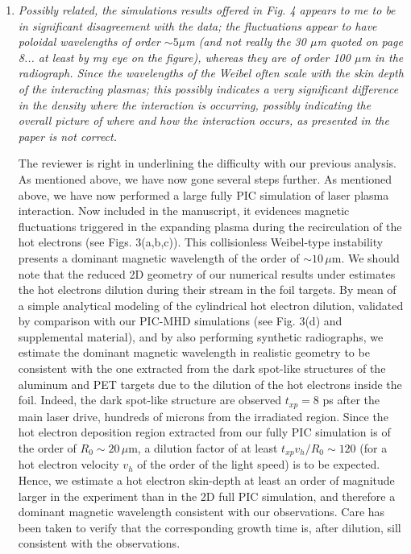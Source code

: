 \documentclass{article}
\begin{document}
\begin{enumerate}
\item \textit{Possibly related, the simulations results offered in Fig. 4 appears to me to be in significant disagreement with the data; the fluctuations appear to have poloidal wavelengths of order $\sim 5 \mu$m (and not really the 30 $\mu$m quoted on page 8... at least by my eye on the figure), whereas they are of order 100 $\mu$m in the radiograph. Since the wavelengths of the Weibel often scale with the skin depth of the interacting plasmas; this possibly indicates a very significant difference in the density where the interaction is occurring, possibly indicating the overall picture of where and how the interaction occurs, as presented in the paper is not correct. }

The reviewer is right in underlining the difficulty with our previous analysis. As mentioned above, we have now gone several steps further. 
As mentioned above, we have now performed a  large fully PIC simulation of laser plasma interaction. Now included in the manuscript, it evidences magnetic fluctuations triggered in the expanding plasma during the recirculation of the hot electrons (see Figs. 3(a,b,c)). This collisionless Weibel-type instability presents a dominant magnetic wavelength of the order of $\sim 10 \, \mu$m.
We should note that the reduced 2D geometry of our numerical results under estimates the hot electrons dilution during their stream in the foil targets. 
By mean of a simple analytical modeling of the cylindrical hot electron dilution, validated by comparison with our PIC-MHD simulations (see Fig. 3(d) and supplemental material), and by also performing synthetic radiographs, we  estimate the  dominant magnetic wavelength in realistic geometry to be consistent with the one extracted from the dark spot-like structures of the aluminum  and PET targets due to the dilution of the hot electrons inside the foil.
Indeed, the dark spot-like structure are observed $t_{xp}   = 8$ ps   after the main laser drive, hundreds of  microns from the irradiated region.
Since the hot electron deposition region extracted from our fully PIC simulation is of the order of $R_0\sim 20\, \mu$m, 
a dilution factor of at least $t_{xp} v_h / R_0 \sim 120$ (for a hot electron velocity $v_h$ of the order of  the light speed) is to be expected. Hence, we estimate a hot electron skin-depth at least  an order of magnitude larger in the experiment than in the 2D full PIC simulation,  and therefore a dominant magnetic wavelength consistent with our observations.
Care has been taken to verify that the corresponding growth time is, after dilution, sill consistent with the observations.


\end{enumerate}
\end{document}
